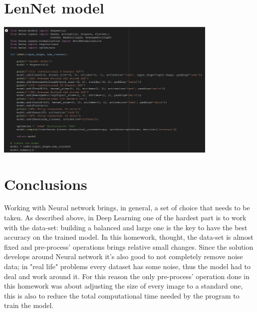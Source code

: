 \documentclass[11pt]{scrartcl}
\begin{document}
{{\newpage
\section{LenNet model}

\begin{center}
	
\hspace{+0.2in}\includegraphics[width=0.8\textwidth]{lenet.png}
\vspace{0.1cm}
	
\end{center}




\newpage
\section{Conclusions}
\hspace{-0.05in}\large{

\vspace{0.5cm}

\noindent
Working with Neural network brings, in general, a set of choice that needs to be taken.
As described above, in Deep Learning one of the hardest part is to work with the data-set: building a balanced and large one is the key to have the best accuracy on the trained model. \newline
In this homework, thought, the data-set is almost fixed and pre-process' operations brings relative small changes. Since the solution develops around Neural network it's also good to not completely remove noise data; in "real life" problems every dataset has some noise, thus the model had to deal and work around it. For this reason the only pre-process' operation done in this homework was about adjusting the size of every image to a standard one, this is also to reduce the total computational time needed by the program to train the model. \newline

}}}
\end{document}
